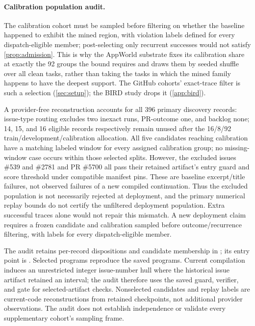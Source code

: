 \paragraph{Calibration population audit.}
\label{app:population-audit}
The calibration cohort must be sampled before filtering on whether the baseline
happened to exhibit the mined region, with violation labels defined for every
dispatch-eligible member; post-selecting only recurrent successes would not
satisfy \cref{prop:admission}. This is why the AppWorld substrate fixes its
calibration share at exactly the 92 groups the bound requires and draws them by
seeded shuffle over all clean tasks, rather than taking the tasks in which the
mined family happens to have the deepest support. The GitHub cohorts'
exact-trace filter is such a selection (\cref{sec:setup}); the BIRD study
drops it (\cref{app:bird}).

A provider-free reconstruction accounts for all 396 primary discovery records:
issue-type routing excludes two inexact runs, PR-outcome one, and backlog none;
14, 15, and 16 eligible records respectively remain unused after the 16/8/92
train/development/calibration allocation. All five candidates reaching
calibration have a matching labeled window for every assigned calibration
group; no missing-window case occurs within those selected splits. However,
the excluded issues \#539 and \#2781 and PR \#5700 all pass their retained
artifact's entry guard and score threshold under compatible manifest pins.
These are baseline excerpt/title failures, not observed failures of a new
compiled continuation. Thus the excluded population is not necessarily
rejected at deployment, and the primary numerical replay bounds do not
certify the unfiltered deployment population. Extra successful traces alone
would not repair this mismatch. A new deployment claim requires a frozen
candidate and calibration sampled before outcome/recurrence filtering, with
labels for every dispatch-eligible member.

The audit retains per-record dispositions and candidate membership in
; its entry point
is . Selected programs
reproduce the saved programs. Current compilation induces an unrestricted
integer issue-number hull where the historical issue artifact retained an
interval; the audit therefore uses the saved guard, verifier, and gate for
selected-artifact checks. Nonselected candidates and replay labels are
current-code reconstructions from retained checkpoints, not additional
provider observations. The audit does not establish independence or validate
every supplementary cohort's sampling frame.


